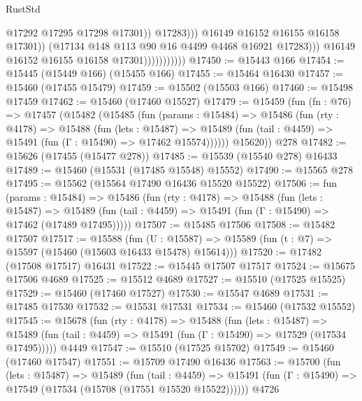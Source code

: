\begin{lexlean}{RustStd}
\begin{coremodule}
                                            @17292
                                            @17295
                                            @17298
                                            @17301))
                                        @17283)))
                                  @16149
                                  @16152
                                  @16155
                                  @16158
                                  @17301))
                              (@17134 @148 @113 @90 @16 @4499 @4468 @16921 @17283)))
                          @16149
                          @16152
                          @16155
                          @16158
                          @17301)))))))))))
@17450 := @15443 @166
@17454 := @15445 (@15449 @166) (@15455 @166)
@17455 := @15464 @16430
@17457 := @15460 (@17455 @15479)
@17459 := @15502 (@15503 @166)
@17460 := @15498 @17459
@17462 := @15460 (@17460 @15527)
@17479 := @15459
    (fun (fn : @76) =>
    @17457
      (@15482
        (@15485
          (fun (params : @15484) =>
          @15486
            (fun (rty : @4178) =>
            @15488
              (fun (lets : @15487) =>
              @15489 (fun (tail : @4459) => @15491 (fun (Γ : @15490) => @17462 @15574))))))
        @15620))
    @278
@17482 := @15626 (@17455 (@15477 @278))
@17485 := @15539 (@15540 @278) @16433
@17489 := @15460 (@15531 (@17485 @15548) @15552)
@17490 := @15565 @278
@17495 := @15562 (@15564 @17490 @16436 @15520 @15522)
@17506 := fun (params : @15484) =>
  @15486
    (fun (rty : @4178) =>
    @15488
      (fun (lets : @15487) =>
      @15489 (fun (tail : @4459) => @15491 (fun (Γ : @15490) => @17462 (@17489 @17495)))))
@17507 := @15485 @17506
@17508 := @15482 @17507
@17517 := @15588
    (fun (U : @15587) => @15589 (fun (t : @7) => @15597 (@15460 (@15603 @16433 @15478) @15614)))
@17520 := @17482 (@17508 @17517) @16431
@17522 := @15445 @17507 @17517
@17524 := @15675 @17506 @4689
@17525 := @15512 @4689
@17527 := @15510 (@17525 @15525)
@17529 := @15460 (@17460 @17527)
@17530 := @15547 @4689
@17531 := @17485 @17530
@17532 := @15531 @17531
@17534 := @15460 (@17532 @15552)
@17545 := @15678
    (fun (rty : @4178) =>
    @15488
      (fun (lets : @15487) =>
      @15489 (fun (tail : @4459) => @15491 (fun (Γ : @15490) => @17529 (@17534 @17495)))))
    @4449
@17547 := @15510 (@17525 @15702)
@17549 := @15460 (@17460 @17547)
@17551 := @15709 @17490 @16436
@17563 := @15700
    (fun (lets : @15487) =>
    @15489
      (fun (tail : @4459) =>
      @15491 (fun (Γ : @15490) => @17549 (@17534 (@15708 (@17551 @15520 @15522))))))
    @4726

\end{coremodule}
\end{lexlean}

